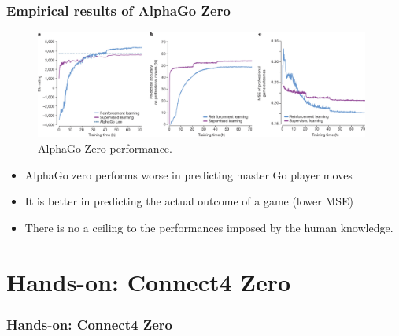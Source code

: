 \documentclass[9pt]{beamer}
\begin{document}
\begin{frame}
	\frametitle{Empirical results of AlphaGo Zero}
	
	\begin{figure}[H]
		\centering
		\includegraphics[width=11cm,trim={0px 0px 0px 45px},clip]{alpha-go-zero_empirical_results.png}
		\caption{AlphaGo Zero performance. \cite{Silver_2016}}
	\end{figure}

	\begin{itemize}
		\item AlphaGo zero performs worse in predicting master Go player moves
		\item It is better in predicting the actual outcome of a game (lower MSE)
		\item There is no a ceiling to the performances imposed by the human knowledge.
	\end{itemize}

\end{frame}


\section{Hands-on: Connect4 Zero}

\begin{frame}
	\frametitle{Hands-on: Connect4 Zero}
	
	\tableofcontents[ 
	currentsubsection, 
	hideothersubsections, 
	sectionstyle=show/shaded,
	]
	
\end{frame}
\end{document}
